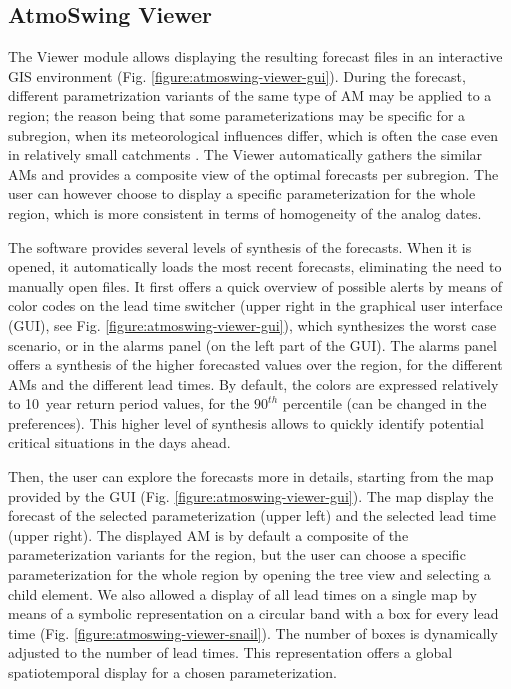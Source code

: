 \documentclass[review]{elsarticle}
\begin{document}
\subsection{AtmoSwing Viewer}
\label{sec:viewer}

The Viewer module allows displaying the resulting forecast files in an interactive GIS environment (Fig. \ref{figure:atmoswing-viewer-gui}). During the forecast, different parametrization variants of the same type of AM may be applied to a region; the reason being that some parameterizations may be specific for a subregion, when its meteorological influences differ, which is often the case even in relatively small catchments \citep{Horton2012}. The Viewer automatically gathers the similar AMs and provides a composite view of the optimal forecasts per subregion. The user can however choose to display a specific parameterization for the whole region, which is more consistent in terms of homogeneity of the analog dates.

The software provides several levels of synthesis of the forecasts. When it is opened, it automatically loads the most recent forecasts, eliminating the need to manually open files. It first offers a quick overview of possible alerts by means of color codes on the lead time switcher (upper right in the graphical user interface (GUI), see Fig. \ref{figure:atmoswing-viewer-gui}), which synthesizes the worst case scenario, or in the alarms panel (on the left part of the GUI). The alarms panel offers a synthesis of the higher forecasted values over the region, for the different AMs and the different lead times. By default, the colors are expressed relatively to 10~year return period values, for the $90^{th}$ percentile (can be changed in the preferences). This higher level of synthesis allows to quickly identify potential critical situations in the days ahead.

Then, the user can explore the forecasts more in details, starting from the map provided by the GUI (Fig. \ref{figure:atmoswing-viewer-gui}). The map display the forecast of the selected parameterization (upper left) and the selected lead time (upper right). The displayed AM is by default a composite of the parameterization variants for the region, but the user can choose a specific parameterization for the whole region by opening the tree view and selecting a child element. We also allowed a display of all lead times on a single map by means of a symbolic representation on a circular band with a box for every lead time (Fig. \ref{figure:atmoswing-viewer-snail}). The number of boxes is dynamically adjusted to the number of lead times. This representation offers a global spatiotemporal display for a chosen parameterization.
\end{document}
